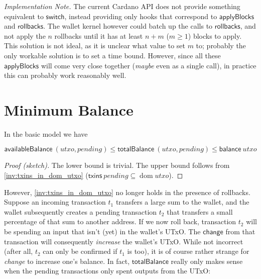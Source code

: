 \documentclass{article}
\DeclareMathOperator{\dom}{dom}
\theoremstyle{definition}{
  \newtheorem{lemma}{Lemma}[section] %
  \newtheorem{definition}[lemma]{Definition}
}
\theoremstyle{theorem}{
  \newtheorem{invariant}[lemma]{Invariant}
  \newtheorem{proofobligation}[lemma]{Proof Obligation}
}
\numberwithin{equation}{lemma}
\begin{document}
\emph{Implementation Note.} The current Cardano API does not provide something
equivalent to $\mathsf{switch}$, instead providing only hooks that correspond to
$\mathsf{applyBlocks}$ and $\mathsf{rollbacks}$. The wallet kernel however could
batch up the calls to $\mathsf{rollbacks}$, and not apply the $n$ rollbacks
until it has at least $n + m$ ($m \ge 1$) blocks to apply. This solution is not
ideal, as it is unclear what value to set $m$ to; probably the only workable
solution is to set a time bound. However, since all these $\mathsf{applyBlocks}$
will come very close together (\emph{maybe} even as a single call), in practice
this can probably work reasonably well.


\section{Minimum Balance}
\label{sec:tracking_expected_UTxO}

In the basic model we have
%
\begin{lemma}
\begin{equation*}
    \mathsf{availableBalance} ~ (\mathit{utxo}, \mathit{pending})
\le \mathsf{totalBalance}     ~ (\mathit{utxo}, \mathit{pending})
\le \mathsf{balance} ~ \mathit{utxo}
\end{equation*}
\label{lem:bounds_in_basic_model}
\end{lemma}

\begin{proof}[Proof (sketch)]
The lower bound is trivial. The upper bound follows from
\cref{inv:txins_in_dom_utxo} ($\mathsf{txins} ~ \mathit{pending}
\subseteq \dom \mathit{utxo}$).
\end{proof}

However, \cref{inv:txins_in_dom_utxo} no longer holds in the presence
of rollbacks. Suppose an incoming transaction $t_1$ transfers a large sum to the
wallet, and the wallet subsequently creates a pending transaction $t_2$ that
transfers a small percentage of that sum to another address. If we now roll
back, transaction $t_2$ will be spending an input that isn't (yet) in the
wallet's UTxO. The $\mathsf{change}$ from that transaction will consequently
\emph{increase} the wallet's UTxO. While not incorrect (after all, $t_2$ can
only be confirmed if $t_1$ is too), it is of course rather strange for
\emph{change} to increase one's balance. In fact, $\mathsf{totalBalance}$
really only makes sense when the pending transactions only spent outputs from
the UTxO:
\end{document}
